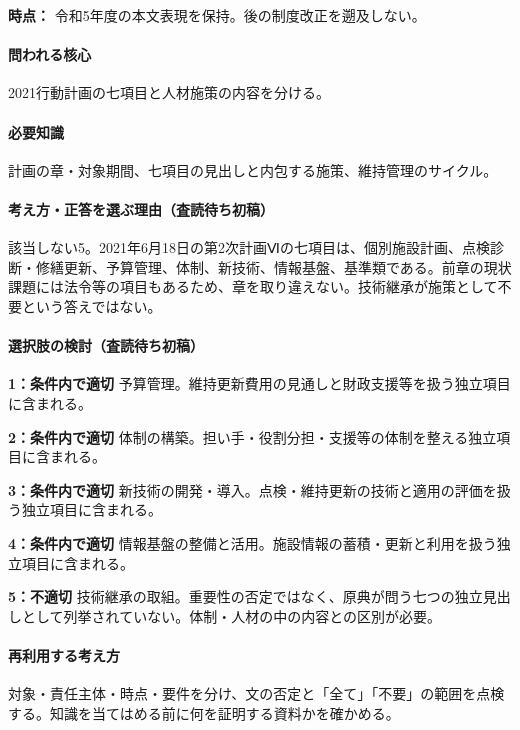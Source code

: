 \noindent\textbf{時点：} 令和5年度の本文表現を保持。後の制度改正を遡及しない。\par

\paragraph{問われる核心} 2021行動計画の七項目と人材施策の内容を分ける。

\paragraph{必要知識} 計画の章・対象期間、七項目の見出しと内包する施策、維持管理のサイクル。

\paragraph{考え方・正答を選ぶ理由（査読待ち初稿）} 該当しない5。2021年6月18日の第2次計画Ⅵの七項目は、個別施設計画、点検診断・修繕更新、予算管理、体制、新技術、情報基盤、基準類である。前章の現状課題には法令等の項目もあるため、章を取り違えない。技術継承が施策として不要という答えではない。

\paragraph{選択肢の検討（査読待ち初稿）}\mbox{}\par

\noindent\textbf{1：条件内で適切} 予算管理。維持更新費用の見通しと財政支援等を扱う独立項目に含まれる。\par

\noindent\textbf{2：条件内で適切} 体制の構築。担い手・役割分担・支援等の体制を整える独立項目に含まれる。\par

\noindent\textbf{3：条件内で適切} 新技術の開発・導入。点検・維持更新の技術と適用の評価を扱う独立項目に含まれる。\par

\noindent\textbf{4：条件内で適切} 情報基盤の整備と活用。施設情報の蓄積・更新と利用を扱う独立項目に含まれる。\par

\noindent\textbf{5：不適切} 技術継承の取組。重要性の否定ではなく、原典が問う七つの独立見出しとして列挙されていない。体制・人材の中の内容との区別が必要。\par

\paragraph{再利用する考え方} 対象・責任主体・時点・要件を分け、文の否定と「全て」「不要」の範囲を点検する。知識を当てはめる前に何を証明する資料かを確かめる。

